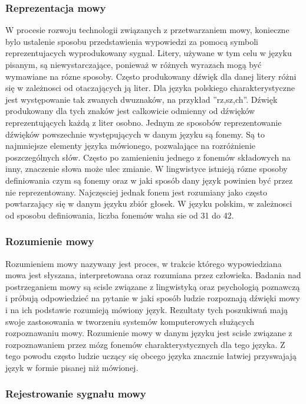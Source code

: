 \documentclass[a4paper,12 pt]{article}
\begin{document}
\subsubsection{Reprezentacja mowy}
W procesie rozwoju technologii związanych z  przetwarzaniem mowy, konieczne bylo ustalenie sposobu przedstawienia wypowiedzi za pomocą symboli reprezentujacych wyprodukowany sygnal. Litery, używane w tym celu w języku pisanym, są niewystarczające, ponieważ w różnych wyrazach mogą być wymawiane na rózne sposoby.  Często produkowany dźwięk dla danej litery różni się w zależnosci od otaczających ją liter. Dla języka polskiego charakterystyczne jest występowanie tak zwanych dwuznaków, na przykład ''rz,sz,ch''. Dźwięk produkowany dla tych znaków jest calkowicie odmienny od dźwięków reprezentujących każdą z liter osobno. 
Jednym ze sposobów reprezentowanie dźwięków powszechnie występujących w danym języku są fonemy. Są to najmniejsze elementy języka mówionego, pozwalające na rozróżnienie poszczególnych słów. Często po zamienieniu jednego z fonemów składowych na inny, znaczenie słowa może ulec zmianie. W lingwistyce istnieją rózne sposoby definiowania czym są fonemy oraz w jaki sposób dany język powinien być przez nie reprezentowany. Najczęsciej jednak fonem jest rozumiany jako często powtarzający się w danym języku zbiór głosek. W języku polskim, w zależnosci od sposobu definiowania, liczba fonemów waha sie od 31 do 42.
\subsubsection{Rozumienie mowy}
Rozumieniem mowy nazywany jest proces, w trakcie którego wypowiedziana mowa jest słyszana, interpretowana oraz rozumiana przez człowieka. Badania nad postrzeganiem mowy są scisle związane
z lingwistyką oraz psychologią poznawczą i próbują odpowiedzieć na pytanie w jaki sposób ludzie rozpoznają dźwięki mowy i na ich podstawie rozumieją mówiony język. Rezultaty tych poszukiwań mają swoje zastosowania w tworzeniu systemów komputerowych służących rozpoznawaniu mowy. Rozumienie mowy w danym języku jest scisle związane z rozpoznawaniem przez mózg fonemów charakterystycznych dla tego języka. Z tego powodu często ludzie uczący się obcego języka znacznie łatwiej przyswajają język w formie pisanej niż mówionej.
\subsubsection{Rejestrowanie sygnału mowy}
\end{document}
